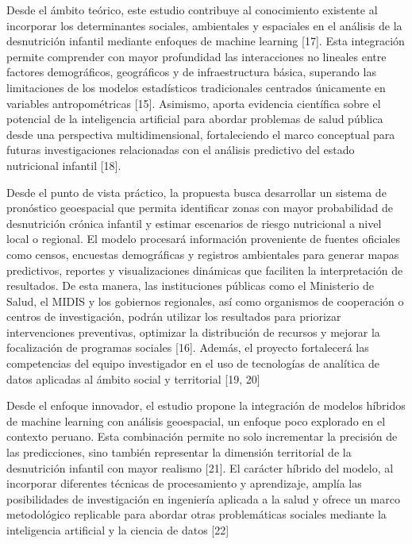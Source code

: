 \documentclass[
]{report}
\begin{document}
Desde el ámbito teórico, este estudio contribuye al conocimiento
existente al incorporar los determinantes sociales, ambientales y
espaciales en el análisis de la desnutrición infantil mediante enfoques
de machine learning {[}17{]}. Esta integración permite comprender con
mayor profundidad las interacciones no lineales entre factores
demográficos, geográficos y de infraestructura básica, superando las
limitaciones de los modelos estadísticos tradicionales centrados
únicamente en variables antropométricas {[}15{]}. Asimismo, aporta
evidencia científica sobre el potencial de la inteligencia artificial
para abordar problemas de salud pública desde una perspectiva
multidimensional, fortaleciendo el marco conceptual para futuras
investigaciones relacionadas con el análisis predictivo del estado
nutricional infantil {[}18{]}.

Desde el punto de vista práctico, la propuesta busca desarrollar un
sistema de pronóstico geoespacial que permita identificar zonas con
mayor probabilidad de desnutrición crónica infantil y estimar escenarios
de riesgo nutricional a nivel local o regional. El modelo procesará
información proveniente de fuentes oficiales como censos, encuestas
demográficas y registros ambientales para generar mapas predictivos,
reportes y visualizaciones dinámicas que faciliten la interpretación de
resultados. De esta manera, las instituciones públicas como el
Ministerio de Salud, el MIDIS y los gobiernos regionales, así como
organismos de cooperación o centros de investigación, podrán utilizar
los resultados para priorizar intervenciones preventivas, optimizar la
distribución de recursos y mejorar la focalización de programas sociales
{[}16{]}. Además, el proyecto fortalecerá las competencias del equipo
investigador en el uso de tecnologías de analítica de datos aplicadas al
ámbito social y territorial {[}19, 20{]}

Desde el enfoque innovador, el estudio propone la integración de modelos
híbridos de machine learning con análisis geoespacial, un enfoque poco
explorado en el contexto peruano. Esta combinación permite no solo
incrementar la precisión de las predicciones, sino también representar
la dimensión territorial de la desnutrición infantil con mayor
realismo {[}21{]}. El carácter híbrido del modelo, al incorporar
diferentes técnicas de procesamiento y aprendizaje, amplía las
posibilidades de investigación en ingeniería aplicada a la salud y
ofrece un marco metodológico replicable para abordar otras problemáticas
sociales mediante la inteligencia artificial y la ciencia de datos
{[}22{]}
\end{document}
